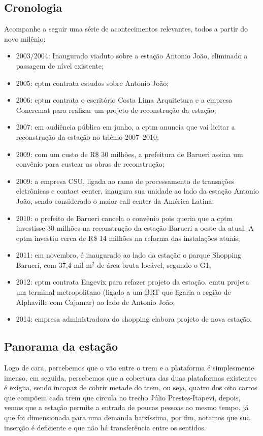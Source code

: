 \documentclass[11pt,fleqn]{book} %
\begin{document}
\subsection{Cronologia}

Acompanhe a seguir uma série de acontecimentos relevantes, todos a partir do novo milênio:

\begin{itemize}
	\item 2003/2004: Inaugurado viaduto sobre a estação Antonio João, eliminado a passagem de nível existente;
	\item 2005: \gls{cptm} contrata estudos sobre Antonio João;
	\item 2006: \gls{cptm} contrata o escritório Costa Lima Arquitetura e a empresa Concremat para realizar um projeto de reconstrução da estação;
	\item 2007: em audiência pública em junho, a \gls{cptm} anuncia que vai licitar a reconstrução da estação no triênio 2007–2010;
	\item 2009: com um custo de R\$ 30 milhões, a prefeitura de Barueri assina um convênio para custear as obras de reconstrução;
	\item 2009: a empresa CSU, ligada ao ramo de processamento de transações eletrônicas e contact center, inaugura sua unidade ao lado da estação Antonio João, sendo considerado o maior call center da América Latina;
	\item 2010: o prefeito de Barueri cancela o convênio pois queria que a \gls{cptm} investisse 30 milhões na reconstrução da estação Barueri a oeste da atual. A \gls{cptm} investiu cerca de R\$ 14 milhões na reforma das instalações atuais;
	\item 2011: em novembro, é inaugurado ao lado da estação o parque Shopping Barueri, com 37,4 mil m$^{2}$ de área bruta locável, segundo o G1;
	\item 2012: \gls{cptm} contrata Engevix para refazer projeto da estação. \gls{emtu} projeta um terminal metropolitano (ligado a um BRT que ligaria a região de Alphaville com Cajamar) ao lado de Antonio João;
	\item 2014: empresa administradora do shopping elabora projeto de nova estação.
\end{itemize}

\subsection{Panorama da estação}

Logo de cara, percebemos que o vão entre o trem e a plataforma é simplesmente imenso, em seguida, percebemos que a cobertura das duas plataformas existentes é exígua, sendo incapaz de cobrir metade do trem, ou seja, quatro dos oito carros que compõem cada trem que circula no trecho Júlio Prestes-Itapevi, depois, vemos que a estação permite a entrada de poucas pessoas ao mesmo tempo, já que foi dimensionada para uma demanda baixíssima, por fim, notamos que sua inserção é deficiente e que não há transferência entre os sentidos.
\end{document}
